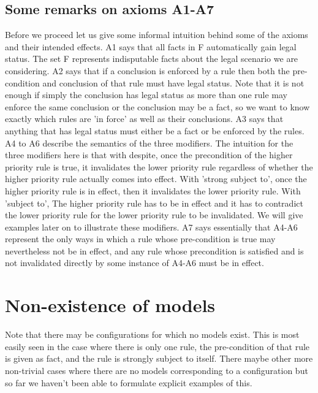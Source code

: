 \subsection{Some remarks on axioms A1-A7}
Before we proceed let us give some informal intuition behind some of the axioms and their intended effects. A1 says that all facts in F automatically gain legal status. The set F represents indisputable facts about the legal scenario we are considering. A2 says that if a conclusion is enforced by a rule then both the pre-condition and conclusion of that rule must have legal status. Note that it is not enough if simply the conclusion has legal status as more than one rule may enforce the same conclusion or the conclusion may be a fact, so we want to know exactly which rules are 'in force' as well as their conclusions. A3 says that anything that has legal status must either be a fact or be enforced by the rules. A4 to A6 describe the semantics of the three modifiers. The intuition for the three modifiers here is that with despite, once the precondition of the higher priority rule is true, it invalidates the lower priority rule regardless of whether the higher priority rule actually comes into effect. With 'strong subject to', once the higher priority rule is in effect, then it invalidates the lower priority rule. With 'subject to', The higher priority rule has to be in effect and it has to contradict the lower priority rule for the lower priority rule to be invalidated. We will give examples later on to illustrate these modifiers. A7 says essentially that A4-A6 represent the only ways in which a rule whose pre-condition is true may nevertheless not be in effect, and any rule whose precondition is satisfied and is not invalidated directly by some instance of A4-A6 must be in effect. 
\section{Non-existence of models}
Note that there may be configurations for which no models exist. This is most easily seen in the case where there is only one rule, the pre-condition of that rule is given as fact, and the rule is strongly subject to itself. There maybe other more non-trivial cases where there are no models corresponding to a configuration but so far we haven't been able to formulate explicit examples of this. 
